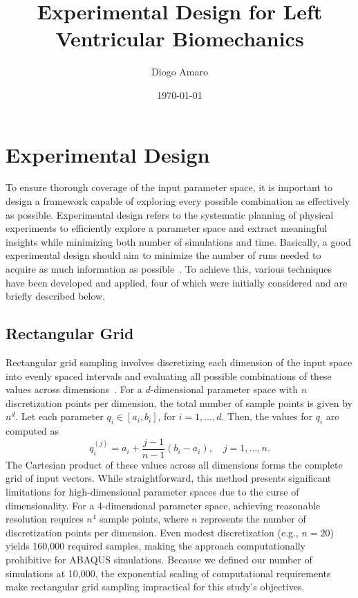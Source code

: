 \documentclass[a4paper,11pt]{article}
\title{Experimental Design for Left Ventricular Biomechanics}
\author{Diogo Amaro}
\date{\today}
\begin{document}
\maketitle

\section{Experimental Design}
\label{subsec:expdes}
To ensure thorough coverage of the input parameter space, it is important to design a framework capable of exploring every possible combination as effectively as possible. Experimental design refers to the systematic planning of physical experiments to efficiently explore a parameter space and extract meaningful insights while minimizing both number of simulations and time. Basically, a good experimental design should aim to minimize the number of runs needed to acquire as much information as possible~\cite{fang2005design}. To achieve this, various techniques have been developed and applied, four of which were initially considered and are briefly described below.


\subsection{Rectangular Grid}
Rectangular grid sampling involves discretizing each dimension of the input space into evenly spaced intervals and evaluating all possible combinations of these values across dimensions~\cite{young1991locally}. For a \( d \)-dimensional parameter space with \( n \) discretization points per dimension, the total number of sample points is given by $n^d$. Let each parameter \( q_i \in [a_i, b_i] \), for \( i = 1, \dots, d \). Then, the values for \( q_i \) are computed as
\begin{equation}
	q_i^{(j)} = a_i + \frac{j - 1}{n - 1}(b_i - a_i), \quad j = 1, \dots, n.
\end{equation}
The Cartesian product of these values across all dimensions forms the complete grid of input vectors. While straightforward, this method presents significant limitations for high-dimensional parameter spaces due to the curse of dimensionality. For a 4-dimensional parameter space, achieving reasonable resolution requires $n^4$ sample points, where $n$ represents the number of discretization points per dimension. Even modest discretization (e.g., $n = 20$) yields 160,000 required samples, making the approach computationally prohibitive for ABAQUS simulations. Because we defined our number of simulations at 10,000, the exponential scaling of computational requirements make rectangular grid sampling impractical for this study's objectives. 
\end{document}
